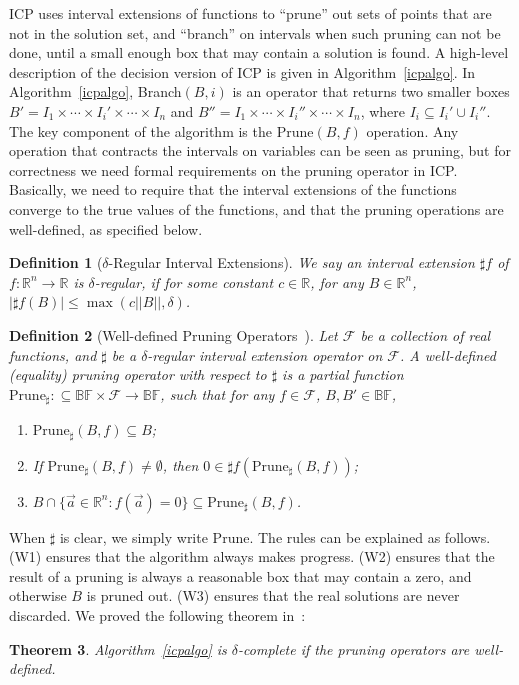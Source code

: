 \documentclass[12pt]{article}
\newtheorem{theorem}{Theorem}[section]
\newtheorem{definition}[theorem]{Definition}
\begin{document}
ICP uses interval extensions of functions to ``prune'' out sets of points that are not in the solution set, and ``branch'' on intervals when such pruning can not be done, until a small enough box that may contain a solution is found. A high-level description of the decision version of ICP is given in Algorithm~\ref{icpalgo}. In Algorithm~\ref{icpalgo}, Branch$(B,i)$ is an operator that returns two smaller boxes $B' = I_1\times\cdots\times I_i'\times\cdots\times I_n$ and $B''=I_1\times \cdots\times I_i''\times \cdots\times I_n$, where $I_i\subseteq I_i'\cup I_i''$. The key component of the algorithm is the $\mathrm{Prune}(B, f)$ operation.  Any operation that contracts the intervals on variables can be seen as pruning, but for correctness we need formal requirements on the pruning operator in ICP.  Basically, we need to require that the interval extensions of the functions converge to the true values of the functions, and that the pruning operations are well-defined, as specified below.  
\begin{definition}[$\delta$-Regular Interval Extensions]
We say an interval extension $\sharp f$ of $f:\mathbb{R}^n\rightarrow \mathbb{R}$ is $\delta$-regular, if for some constant $c\in\mathbb{R}$, for any $B\in \mathbb{R}^n$, $|\sharp f(B)|\leq \max(c||B||, \delta)$. 
\end{definition}
\begin{definition}[Well-defined Pruning Operators~\cite{DBLP:conf/cade/GaoAC12}]\label{well}
Let $\mathcal{F}$ be a collection of real functions, and $\sharp$ be a $\delta$-regular interval extension operator on $\mathcal{F}$. A {\em well-defined (equality) pruning operator} with respect to $\sharp$ is a partial function $\mathrm{Prune}_{\sharp} : \subseteq \mathbb{BF}\times \mathcal{F}\rightarrow \mathbb{BF}$, such that for any $f\in \mathcal{F}$, $B,B'\in \mathbb{BF}$,
\begin{enumerate}
\item $\mathrm{Prune}_{\sharp}(B, f)\subseteq B$;
\item If $\mathrm{Prune}_{\sharp}(B,f)\neq \emptyset$, then $0\in \sharp f(\mathrm{Prune}_{\sharp}(B,f))$;
\item $B \cap \{\vec a\in \mathbb{R}^n: f(\vec a)=0\} \subseteq \mathrm{Prune}_{\sharp}(B, f)$.
\end{enumerate}
\end{definition}
When $\sharp$ is clear, we simply write $\mathrm{Prune}$. The rules can be explained as follows. (W1) ensures that the algorithm always makes progress. (W2) ensures that the result of a pruning is always a reasonable box that may contain a zero, and otherwise $B$ is pruned out. (W3) ensures that the real solutions are never discarded. We proved the following theorem in~\cite{DBLP:conf/cade/GaoAC12}:
\begin{theorem}
Algorithm~\ref{icpalgo} is $\delta$-complete if the pruning operators are well-defined. 
\end{theorem}
\end{document}
